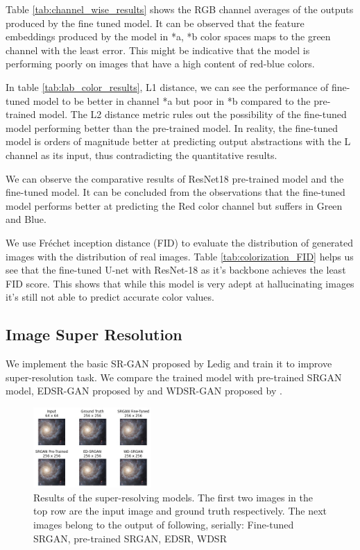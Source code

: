 \documentclass[conference]{IEEEtran}
\begin{document}


Table \ref{tab:channel_wise_results} shows the RGB channel averages of the outputs produced by the fine tuned model. It can be observed that the feature embeddings produced by the model in *a, *b color spaces maps to the green channel with the least error. This might be indicative that the model is performing poorly on images that have a high content of red-blue colors.


In table \ref{tab:lab_color_results}, L1 distance, we can see the performance of fine-tuned model to be better in channel *a but poor in *b compared to the pre-trained model. The L2 distance metric rules out the possibility of the fine-tuned model performing better than the pre-trained model. In reality, the fine-tuned model is orders of magnitude better at predicting output abstractions with the L channel as its input, thus contradicting the quantitative results.


We can observe the comparative results of ResNet18 pre-trained model and the fine-tuned model. It can be concluded from the observations that the fine-tuned model performs better at predicting the Red color channel but suffers in Green and Blue.


We use Fréchet inception distance (FID) to evaluate the distribution of generated images with the distribution of real images. Table \ref{tab:colorization_FID} helps us see that the fine-tuned U-net with ResNet-18 as it's backbone achieves the least FID score. This shows that while this model is very adept at hallucinating images it's still not able to predict accurate color values.

\subsection{Image Super Resolution}
\hspace*{0.25 in}We implement the basic SR-GAN proposed by Ledig and train it to improve super-resolution task. We compare the trained model with pre-trained SRGAN model, EDSR-GAN proposed by \cite{lim2017enhanced} and WDSR-GAN proposed by \cite{yu2018wide}.

\begin{figure}[!htb]
	\includegraphics[width=0.4\textwidth]{figures/comparison_upscale}
	\caption{Results of the super-resolving models. The first two images in the top row are the input image and ground truth respectively. The next images belong to the output of following, serially: Fine-tuned SRGAN, pre-trained SRGAN, EDSR, WDSR}
	\label{fig: sr_results}
\end{figure}
\end{document}
